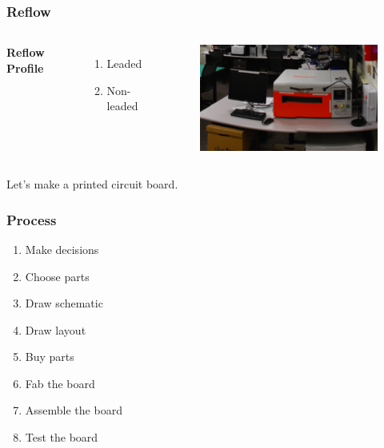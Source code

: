 \documentclass{beamer}
\begin{document}

\begin{frame}
\frametitle{Reflow}
\begin{columns}[c] %

\textbf{Reflow Profile}
\begin{enumerate}
\item Leaded
\item Non-leaded
\end{enumerate}

\begin{figure}
\includegraphics[width=0.8\linewidth]{psu-epl.png}
\end{figure}

\end{columns}
\end{frame}

\begin{frame}
\Huge{\centerline{Let's make a printed circuit board.}}
\end{frame}

\begin{frame}
\frametitle{Process}

\begin{enumerate}
\item Make decisions
\item Choose parts
\item Draw schematic
\item Draw layout
\item Buy parts
\item Fab the board
\item Assemble the board
\item Test the board
\end{enumerate}

\end{frame}
\end{document}
